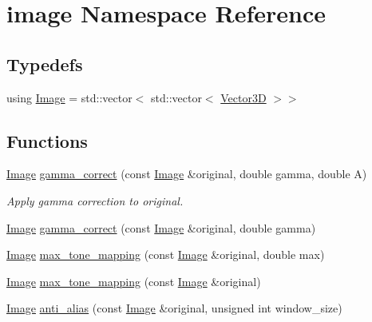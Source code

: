 \hypertarget{namespaceimage}{}\section{image Namespace Reference}
\label{namespaceimage}
\subsection*{Typedefs}
\begin{DoxyCompactItemize}
\item 
using \hyperlink{namespaceimage_a83002366a99c023ab0256f2c16122bef}{Image} = std\+::vector$<$ std\+::vector$<$ \hyperlink{classVector3D}{Vector3D} $>$$>$
\end{DoxyCompactItemize}
\subsection*{Functions}
\begin{DoxyCompactItemize}
\item 
\hyperlink{namespaceimage_a83002366a99c023ab0256f2c16122bef}{Image} \hyperlink{namespaceimage_a350994eafb0492e40cb74c116873a7ae}{gamma\+\_\+correct} (const \hyperlink{namespaceimage_a83002366a99c023ab0256f2c16122bef}{Image} \&original, double gamma, double A)
\begin{DoxyCompactList}\small\item\em Apply gamma correction to original. \end{DoxyCompactList}\item 
\hyperlink{namespaceimage_a83002366a99c023ab0256f2c16122bef}{Image} \hyperlink{namespaceimage_a0d356b98f4bd21ca658d5c83e191cbe2}{gamma\+\_\+correct} (const \hyperlink{namespaceimage_a83002366a99c023ab0256f2c16122bef}{Image} \&original, double gamma)
\item 
\hyperlink{namespaceimage_a83002366a99c023ab0256f2c16122bef}{Image} \hyperlink{namespaceimage_a3646524ebdcbde53e3d2f4bfa47a024a}{max\+\_\+tone\+\_\+mapping} (const \hyperlink{namespaceimage_a83002366a99c023ab0256f2c16122bef}{Image} \&original, double max)
\item 
\hyperlink{namespaceimage_a83002366a99c023ab0256f2c16122bef}{Image} \hyperlink{namespaceimage_acad5a9459043f5ce5b565e771b0867f8}{max\+\_\+tone\+\_\+mapping} (const \hyperlink{namespaceimage_a83002366a99c023ab0256f2c16122bef}{Image} \&original)
\item 
\hyperlink{namespaceimage_a83002366a99c023ab0256f2c16122bef}{Image} \hyperlink{namespaceimage_ae465266083a6ee29947db193e0881ff2}{anti\+\_\+alias} (const \hyperlink{namespaceimage_a83002366a99c023ab0256f2c16122bef}{Image} \&original, unsigned int window\+\_\+size)
\end{DoxyCompactItemize}


